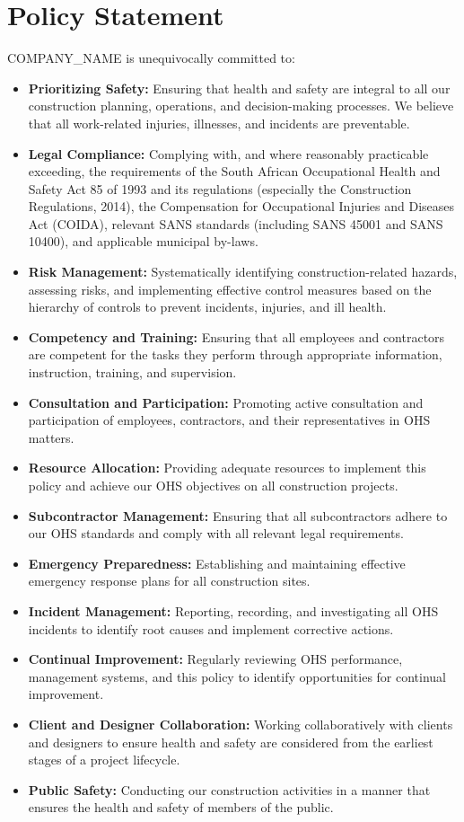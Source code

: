 \documentclass[12pt]{article}
\begin{document}
\section{Policy Statement}
{{COMPANY_NAME}} is unequivocally committed to:
\begin{itemize}
    \item \textbf{Prioritizing Safety:} Ensuring that health and safety are integral to all our construction planning, operations, and decision-making processes. We believe that all work-related injuries, illnesses, and incidents are preventable.
    \item \textbf{Legal Compliance:} Complying with, and where reasonably practicable exceeding, the requirements of the South African Occupational Health and Safety Act 85 of 1993 and its regulations (especially the Construction Regulations, 2014), the Compensation for Occupational Injuries and Diseases Act (COIDA), relevant SANS standards (including SANS 45001 and SANS 10400), and applicable municipal by-laws.
    \item \textbf{Risk Management:} Systematically identifying construction-related hazards, assessing risks, and implementing effective control measures based on the hierarchy of controls to prevent incidents, injuries, and ill health.
    \item \textbf{Competency and Training:} Ensuring that all employees and contractors are competent for the tasks they perform through appropriate information, instruction, training, and supervision.
    \item \textbf{Consultation and Participation:} Promoting active consultation and participation of employees, contractors, and their representatives in OHS matters.
    \item \textbf{Resource Allocation:} Providing adequate resources to implement this policy and achieve our OHS objectives on all construction projects.
    \item \textbf{Subcontractor Management:} Ensuring that all subcontractors adhere to our OHS standards and comply with all relevant legal requirements.
    \item \textbf{Emergency Preparedness:} Establishing and maintaining effective emergency response plans for all construction sites.
    \item \textbf{Incident Management:} Reporting, recording, and investigating all OHS incidents to identify root causes and implement corrective actions.
    \item \textbf{Continual Improvement:} Regularly reviewing OHS performance, management systems, and this policy to identify opportunities for continual improvement.
    \item \textbf{Client and Designer Collaboration:} Working collaboratively with clients and designers to ensure health and safety are considered from the earliest stages of a project lifecycle.
    \item \textbf{Public Safety:} Conducting our construction activities in a manner that ensures the health and safety of members of the public.
\end{itemize}
\end{document}
